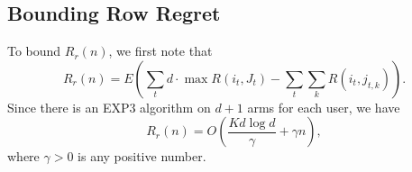 \subsection{Bounding Row Regret}

To bound $R_r(n)$, we first note that
$$R_r(n) =  E \left( \sum_{t} d\cdot \max R(i_t,J_t)  - \sum_{t} \sum_k R(i_t,j_{t,k}) \right) .$$ 
Since there is an EXP3 algorithm on $d+1$ arms for each user, we have
$$R_r(n) = O \left( \frac{K d\log d}{\gamma} + \gamma n  \right),$$
where $\gamma >0$ is any positive number.
%

